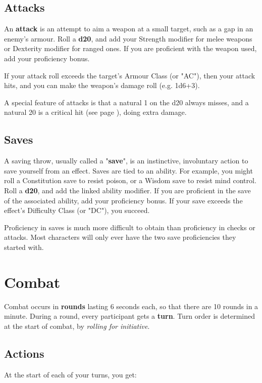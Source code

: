 \documentclass[letterpaper,twocolumn,openany,nodeprecatedcode,bg=print]{dndbook}
\newcommand{\pg}[1]{page \pageref{#1}}
\newcommand{\see}[1]{(see \pg{#1})}
\begin{document}
\subsection{Attacks}
An \textbf{attack} is an attempt to aim a weapon at a small target, such as a gap in an enemy's armour. 
Roll a \textbf{d20}, and add your Strength modifier for melee weapons or Dexterity modifier for ranged ones. 
If you are proficient with the weapon used, add your proficiency bonus.

If your attack roll exceeds the target's Armour Class (or "AC"), then your attack hits, and you can make the weapon's damage roll (e.g. 1d6+3).

A special feature of attacks is that a natural 1 on the d20 always misses, and a natural 20 is a critical hit \see{critical-hit}, doing extra damage.

\subsection{Saves}
A saving throw, usually called a "\textbf{save}", is an instinctive, involuntary action to save yourself from an effect. 
Saves are tied to an ability. 
For example, you might roll a Constitution save to resist poison, or a Wisdom save to resist mind control. 
Roll a \textbf{d20}, and add the linked ability modifier. 
If you are proficient in the save of the associated ability, add your proficiency bonus.
If your save exceeds the effect's Difficulty Class (or "DC"), you succeed.

Proficiency in saves is much more difficult to obtain than proficiency in checks or attacks. 
Most characters will only ever have the two save proficiencies they started with.





\section{Combat}
Combat occurs in \textbf{rounds} lasting 6 seconds each, so that there are 10 rounds in a minute. 
During a round, every participant gets a \textbf{turn}. 
Turn order is determined at the start of combat, by \textit{rolling for initiative}.

\subsection{Actions}
At the start of each of your turns, you get:
\end{document}
